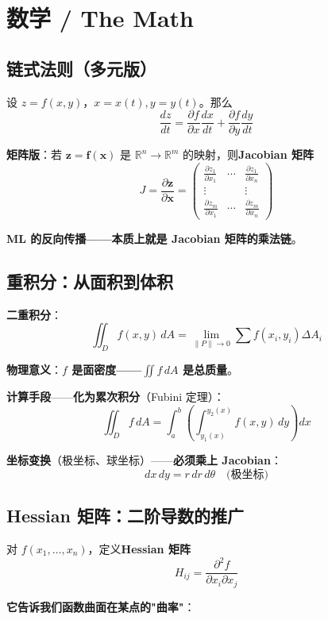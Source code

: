 \section{数学 / The Math}

\subsection{链式法则（多元版）}

设 $z = f(x, y)$，$x = x(t), y = y(t)$。那么
\[
\frac{dz}{dt} = \frac{\partial f}{\partial x} \frac{dx}{dt} + \frac{\partial f}{\partial y} \frac{dy}{dt}
\]

\textbf{矩阵版}：若 $\bm{z} = \bm{f}(\bm{x})$ 是 $\mathbb{R}^n \to \mathbb{R}^m$ 的映射，则\textbf{Jacobian 矩阵}
\[
J = \frac{\partial \bm{z}}{\partial \bm{x}} = \begin{pmatrix}
\frac{\partial z_1}{\partial x_1} & \cdots & \frac{\partial z_1}{\partial x_n} \\
\vdots & & \vdots \\
\frac{\partial z_m}{\partial x_1} & \cdots & \frac{\partial z_m}{\partial x_n}
\end{pmatrix}
\]

\textbf{ML 的反向传播——本质上就是 Jacobian 矩阵的乘法链}。

\subsection{重积分：从面积到体积}

\textbf{二重积分}：
\[
\iint_D f(x,y) \, dA = \lim_{\|P\|\to 0} \sum f(x_i, y_i) \Delta A_i
\]

\textbf{物理意义}：\textbf{$f$ 是面密度——$\iint f \, dA$ 是总质量}。

\textbf{计算手段}——\textbf{化为累次积分}（Fubini 定理）：
\[
\iint_D f \, dA = \int_a^b \left( \int_{y_1(x)}^{y_2(x)} f(x, y) \, dy \right) dx
\]

\textbf{坐标变换}（极坐标、球坐标）——\textbf{必须乘上 Jacobian}：
\[
dx \, dy = r \, dr \, d\theta \quad \text{(极坐标)}
\]

\subsection{Hessian 矩阵：二阶导数的推广}

对 $f(x_1, \ldots, x_n)$，定义\textbf{Hessian 矩阵}
\[
H_{ij} = \frac{\partial^2 f}{\partial x_i \partial x_j}
\]

\textbf{它告诉我们函数曲面在某点的"曲率"}：

